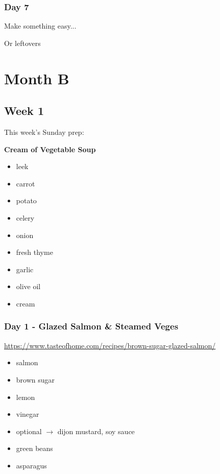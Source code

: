 \documentclass[11pt, a4paper]{article}
\begin{document}
\subsubsection{Day 7}
\vspace{1pc}
\noindent Make something easy...
\par
Or leftovers


\vspace{0.917 pc} %

\pagebreak
\section{Month B}

\subsection{Week 1}

This week's Sunday prep:
\par
\vspace{1pc}
\noindent\textbf{Cream of Vegetable Soup}
\par
\begin{itemize}
\item leek
\item carrot
\item potato
\item celery
\item onion
\item fresh thyme
\item garlic
\item olive oil
\item cream
\end{itemize}

\subsubsection{Day 1 - Glazed Salmon \& Steamed Veges}
\vspace{1pc}
\small{\url{https://www.tasteofhome.com/recipes/brown-sugar-glazed-salmon/}}
\begin{itemize}
\item salmon
\item brown sugar
\item lemon
\item vinegar
\item optional $\longrightarrow$ dijon mustard, soy sauce
\item green beans
\item asparagus
\end{itemize}
\end{document}
